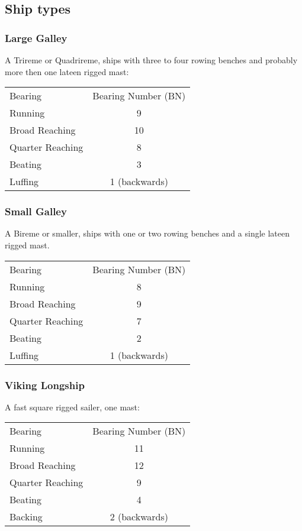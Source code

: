 \documentclass[11pt]{wbzine}
\begin{document}
\begin{multicols}{2}
\subsection{Ship types}

\subsubsection{Large Galley}

A Trireme or Quadrireme, ships with three to four rowing benches and
probably more then one lateen rigged mast:

\begin{tabularx}{\columnwidth}{Zc}
Bearing & Bearing Number (BN) \\
Running & 9 \\
Broad Reaching & 10 \\
Quarter Reaching & 8 \\
Beating & 3 \\
Luffing & 1 (backwards) \\
\end{tabularx}

\subsubsection{Small Galley}

A Bireme or smaller, ships with one or two rowing benches and a single
lateen rigged mast.

\begin{tabularx}{\columnwidth}{Zc}
Bearing & Bearing Number (BN) \\
Running & 8 \\
Broad Reaching & 9 \\
Quarter Reaching & 7 \\
Beating & 2 \\
Luffing & 1 (backwards) \\
\end{tabularx}

\subsubsection{Viking Longship}

A fast square rigged sailer, one mast:

\begin{tabularx}{\columnwidth}{Zc}
Bearing & Bearing Number (BN) \\
Running & 11 \\
Broad Reaching & 12 \\
Quarter Reaching & 9 \\
Beating & 4 \\
Backing & 2 (backwards) \\
\end{tabularx}


\end{multicols}
\end{document}
